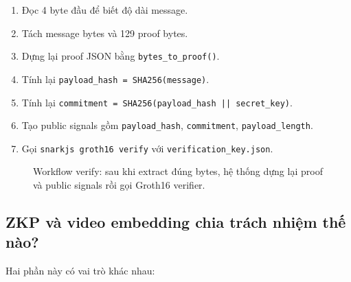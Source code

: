 \documentclass[11pt,a4paper]{article}
\begin{document}
\begin{enumerate}[leftmargin=*]
  \item Đọc 4 byte đầu để biết độ dài message.
  \item Tách message bytes và 129 proof bytes.
  \item Dựng lại proof JSON bằng \texttt{bytes\_to\_proof()}.
  \item Tính lại \texttt{payload\_hash = SHA256(message)}.
  \item Tính lại \texttt{commitment = SHA256(payload\_hash || secret\_key)}.
  \item Tạo public signals gồm \texttt{payload\_hash}, \texttt{commitment}, \texttt{payload\_length}.
  \item Gọi \texttt{snarkjs groth16 verify} với \texttt{verification\_key.json}.
\end{enumerate}

\begin{figure}[H]
\centering
{}
\caption{Workflow verify: sau khi extract đúng bytes, hệ thống dựng lại proof và public signals rồi gọi Groth16 verifier.}
\label{fig:zkp-verify}
\end{figure}

\subsection{ZKP và video embedding chia trách nhiệm thế nào?}

Hai phần này có vai trò khác nhau:
\end{document}
